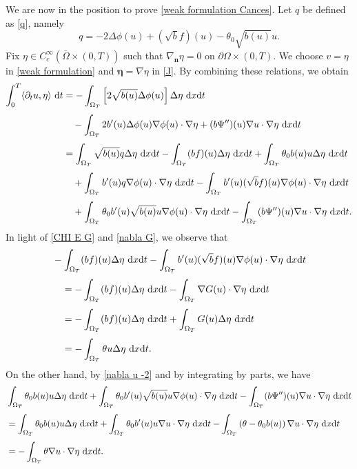 \documentclass[11pt,  reqno]{amsart}%
\theoremstyle{plain}
\theoremstyle{definition}
\theoremstyle{remark}
\numberwithin{equation}{section}
\newcommand{\dx}{\textup{d}x}
\newcommand{\dt}{\textup{d}t}
\begin{document}
We are now in the position to prove \eqref{weak formulation Cances}.
Let $q$ be defined as \eqref{q}, 
namely 
$$
q= -2 \Delta \phi(u) + (\sqrt{b}f )(u)- \theta_0 \sqrt{b(u)}u.
$$
Fix $\eta \in C_c^\infty\left( \overline{\Omega}\times (0,T)\right)$ such that $\nabla_{\mathbf{n}} \eta=0$ on $\partial \Omega \times (0,T)$.
We choose $v= \eta$ in \eqref{weak formulation} and $\boldsymbol{\eta}=\nabla \eta$ in \eqref{J}. By combining these relations, we obtain
\begin{align*}
 \int_0^T \langle \partial_t u, \eta \rangle \  \dt 
 & =
- \int_{\Omega_T} \left[2\sqrt{b(u)}\Delta \phi(u) \right] \Delta \eta \ \dx \dt  \notag 
\\[3pt]
& \quad - \int_{\Omega_T} 2 b'(u) \Delta \phi(u)\nabla \phi(u) \cdot \nabla\eta  
+ (b\Psi'')(u) \nabla u \cdot \nabla \eta \ \dx \dt
\\[3pt]
&
=\int_{\Omega_T} \sqrt{b(u)} q \Delta \eta \ \dx \dt  
- \int_{\Omega_T} (bf )(u) \Delta \eta \ \dx \dt
+\int_{\Omega_T} \theta_0 b(u) u \Delta \eta \ \dx \dt
\notag 
\\[3pt]
& \quad + \int_{\Omega_T}  b'(u)  q \nabla \phi(u) \cdot \nabla\eta  \ \dx \dt
- \int_{\Omega_T} b'(u) (\sqrt{b}f )(u) \nabla \phi(u)\cdot \nabla \eta \ \dx \dt \notag
\\[3pt]
&\quad 
+\int_{\Omega_T} \theta_0 b'(u) \sqrt{b(u)} u \nabla \phi(u)\cdot \nabla \eta \ \dx \dt
- \int_{\Omega_T} (b\Psi'')(u) \nabla u \cdot \nabla \eta \ \dx \dt.
\end{align*}
In light of \eqref{CHI E G} and \eqref{nabla G}, we observe that
\begin{align*}
&- \int_{\Omega_T} (b f )(u) \Delta \eta \ \dx \dt
- \int_{\Omega_T} b'(u) (\sqrt{b}f )(u) \nabla \phi(u)\cdot \nabla \eta \ \dx \dt
\\[3pt]
&\quad = - \int_{\Omega_T} (b f )(u) \Delta \eta \ \dx \dt
- \int_{\Omega_T} \nabla G(u) \cdot \nabla \eta \ \dx \dt
\\[3pt]
&\quad = - \int_{\Omega_T} (b f )(u) \Delta \eta \ \dx \dt
+ \int_{\Omega_T} G(u) \Delta \eta \ \dx \dt
\\[3pt]
&\quad =-
\int_{\Omega_T}  \theta u \Delta \eta \ \dx \dt.
\end{align*}
On the other hand, by \eqref{nabla u -2} and by integrating by parts, we have
\begin{align*}
&\int_{\Omega_T} \theta_0 b(u) u \Delta \eta \ \dx \dt
+\int_{\Omega_T} \theta_0 b'(u) \sqrt{b(u)} u \nabla \phi(u)\cdot \nabla \eta \ \dx \dt
- \int_{\Omega_T} (b\Psi'')(u) \nabla u \cdot \nabla \eta \ \dx \dt
\\[3pt]
&
=
\int_{\Omega_T} \theta_0 b(u) u \Delta \eta \ \dx \dt
+\int_{\Omega_T} \theta_0 b'(u) u \nabla u \cdot \nabla \eta \ \dx \dt
- \int_{\Omega_T} 	\left(\theta -\theta_0 b(u)\right) \nabla u \cdot \nabla \eta \ \dx \dt
\\[3pt]
&=- \int_{\Omega_T} 	\theta \nabla u \cdot \nabla \eta \ \dx \dt.
\end{align*}
\end{document}
